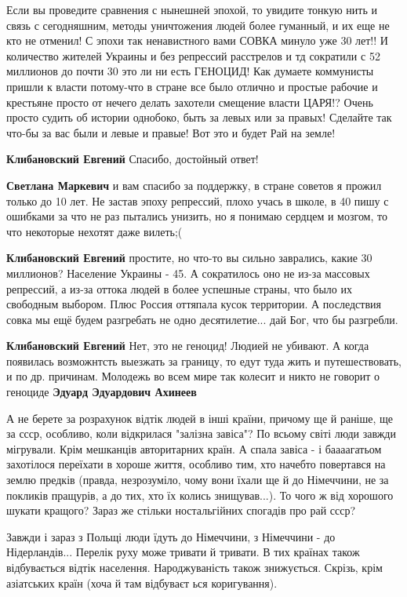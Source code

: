 \begin{itemize}
\begin{itemize}
Если вы проведите сравнения с нынешней эпохой, то увидите тонкую нить и связь с
сегодняшним, методы уничтожения людей более гуманный, и их еще не кто не
отменил! С эпохи так ненавистного вами СОВКА минуло уже 30 лет!! И количество
жителей Украины и без репрессий расстрелов и тд сократили с 52 миллионов до
почти 30 это ли ни есть ГЕНОЦИД! Как думаете коммунисты пришли к власти
потому-что в стране все было отлично и простые рабочие и крестьяне просто от
нечего делать захотели смещение власти ЦАРЯ!? Очень просто судить об истории
однобоко, быть за левых или за правых! Сделайте так что-бы за вас были и левые
и правые! Вот это и будет Рай на земле!

\begin{itemize} %
\textbf{Клибановский Евгений} Спасибо, достойный ответ!

\textbf{Светлана Маркевич} и вам спасибо за поддержку, в стране советов я прожил только до 10 лет. Не застав эпоху репрессий, плохо учась в школе, в 40 пишу с ошибками за что не раз пытались унизить, но я понимаю сердцем и мозгом, то что некоторые нехотят даже вилеть;(

\textbf{Клибановский Евгений} простите, но что-то вы сильно заврались, какие 30 миллионов? Население Украины - 45. А сократилось оно не из-за массовых репрессий, а из-за оттока людей в более успешные страны, что было их свободным выбором. Плюс Россия оттяпала кусок территории. А последствия совка мы ещё будем разгребать не одно десятилетие... дай Бог, что бы разгребли.

\textbf{Клибановский Евгений} Нет, это не геноцид! Людией не убивают. А когда появилась возможнтсть выезжать за границу, то едут туда жить и путешествовать, и по др. причинам. Молодежь во всем мире так колесит и никто не говорит о геноциде
\textbf{Эдуард Эдуардович Ахинеев}

А не берете за розрахунок відтік людей в інші країни, причому ще й раніше, ще
за ссср, особливо, коли відкрилася "залізна завіса"? По всьому світі люди
завжди мігрували. Крім мешканців авторитарних країн. А спала завіса - і
баааагатьом захотілося переїхати в хороше життя, особливо тим, хто начебто
повертався на землю предків (правда, незрозуміло, чому вони їхали ще й до
Німеччини, не за покликів пращурів, а до тих, хто їх колись знищував...). То
чого ж від хорошого шукати кращого? Зараз же стільки ностальгійних спогадів про
рай ссср?

Завжди і зараз з Польщі люди їдуть до Німеччини, з Німеччини - до
Нідерландів... Перелік руху може тривати й тривати. В тих країнах також
відбувається відтік населення. Народжуваність також знижується. Скрізь, крім
азіатських країн (хоча й там відбуваєт ься коригування).


\end{itemize}
\end{itemize}
\end{itemize}
